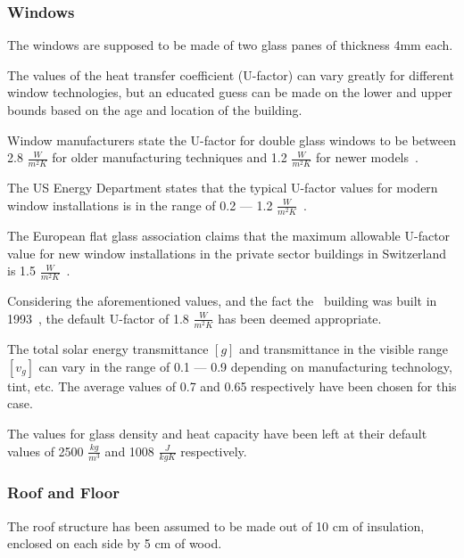 \subsubsection{Windows}

The windows are supposed to be made of two glass panes of thickness 4mm each.

The values of the heat transfer coefficient (U-factor) can vary greatly for
different window technologies, but an educated guess can be made on the lower
and upper bounds based on the age and location of the building. 

Window manufacturers state
the U-factor for double glass windows to be between 2.8 \(\frac{W}{m^2K}\) for
older manufacturing techniques and 1.2 \(\frac{W}{m^2K}\) for newer
models~\cite{WhatAreTypical2018}. 

The US Energy Department states that the
typical U-factor values for modern window installations is in the range of 0.2
--- 1.2 \(\frac{W}{m^2K}\)~\cite{GuideEnergyEfficientWindows}. 

The European flat glass association claims that the maximum allowable U-factor
value for new window installations in the private sector buildings in
Switzerland is 1.5
\(\frac{W}{m^2K}\)~\cite{glassforeuropeMinimumPerformanceRequirements2018}.

Considering the aforementioned values, and the fact the \pdome\ building was
built in 1993~\cite{nattererModelingMultilayerBeam2008}, the default U-factor of
1.8 \(\frac{W}{m^2K}\) has been deemed appropriate.

The total solar energy transmittance $[g]$ and transmittance in the visible
range $[v_g]$ can vary in the range of 0.1 --- 0.9 depending on manufacturing
technology, tint, etc. The average values of 0.7 and 0.65 respectively have been
chosen for this case.

The values for glass density and heat capacity have been left at their default
values of 2500 \(\frac{kg}{m^3}\) and 1008 \(\frac{J}{kgK}\) respectively.

\subsubsection{Roof and Floor}


The roof structure has been assumed to be made out of 10 cm of insulation,
enclosed on each side by 5 cm of wood.

